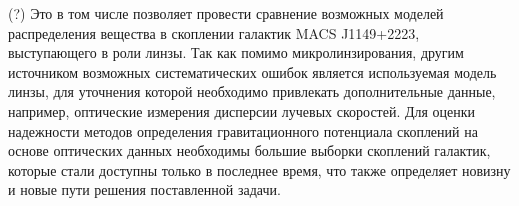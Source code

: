 (?) Это в том числе позволяет провести сравнение возможных моделей распределения вещества в скоплении галактик MACS J1149+2223, выступающего в роли линзы. Так как помимо микролинзирования, другим источником возможных систематических ошибок является используемая модель линзы, для уточнения которой необходимо привлекать дополнительные данные, например, оптические измерения дисперсии лучевых скоростей. Для оценки надежности методов определения гравитационного потенциала скоплений на основе оптических данных необходимы большие выборки скоплений галактик, которые стали доступны только в последнее время, что также определяет новизну и новые пути решения поставленной задачи.


